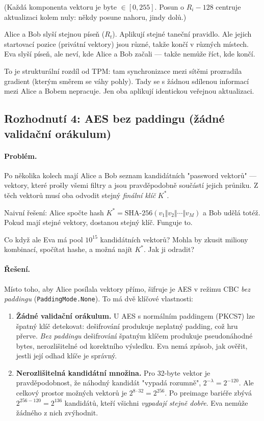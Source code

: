 \documentclass[11pt,a4paper]{article}
\begin{document}
(Každá komponenta vektoru je byte $\in [0, 255]$. Posun o $R_i - 128$ centruje aktualizaci kolem nuly: někdy posune nahoru, jindy dolů.)

\begin{aha}
Alice a Bob slyší stejnou píseň ($R_t$). Aplikují stejné taneční pravidlo. Ale jejich startovací pozice (privátní vektory) jsou různé, takže končí v různých místech. Eva slyší píseň, ale neví, kde Alice a Bob začali --- takže nemůže říct, kde končí.
\end{aha}

To je strukturální rozdíl od TPM: tam synchronizace mezi sítěmi prozradila gradient (kterým směrem se váhy pohly). Tady se s žádnou sdílenou informací mezi Alice a Bobem nepracuje. Jen oba aplikují identickou veřejnou aktualizaci.

\subsection{Rozhodnutí 4: AES bez paddingu (žádné validační orákulum)}\label{pop:design-aes}

\paragraph{Problém.} Po několika kolech mají Alice a Bob seznam kandidátních "password vektorů" --- vektory, které prošly všemi filtry a jsou pravděpodobně součástí jejich průniku. Z těch vektorů musí oba odvodit stejný \emph{finální klíč} $K^*$.

Naivní řešení: Alice spočte hash $K^* = \text{SHA-256}(v_1 \Vert v_2 \Vert \cdots \Vert v_M)$ a Bob udělá totéž. Pokud mají stejné vektory, dostanou stejný klíč. Funguje to.

Co když ale Eva má pool $10^{15}$ kandidátních vektorů? Mohla by zkusit miliony kombinací, spočítat hashe, a možná najít $K^*$. Jak ji odradit?

\paragraph{Řešení.} Místo toho, aby Alice posílala vektory přímo, šifruje je AES v režimu CBC \emph{bez paddingu} (\texttt{PaddingMode.None}). To má dvě klíčové vlastnosti:

\begin{enumerate}[leftmargin=*]
\item \textbf{Žádné validační orákulum.} U AES s normálním paddingem (PKCS7) lze špatný klíč detekovat: dešifrování produkuje neplatný padding, což hru přerve. \emph{Bez paddingu} dešifrování špatným klíčem produkuje pseudonáhodné bytes, nerozlišitelné od korektního výsledku. Eva nemá způsob, jak ověřit, jestli její odhad klíče je správný.
\item \textbf{Nerozlišitelná kandidátní množina.} Pro 32-byte vektor je pravděpodobnost, že náhodný kandidát "vypadá rozumně", $2^{-\lambda} = 2^{-120}$. Ale celkový prostor možných vektorů je $2^{8 \cdot 32} = 2^{256}$. Po preimage bariéře zbývá $2^{256-120} = 2^{136}$ kandidátů, kteří všichni \emph{vypadají stejně dobře}. Eva nemůže žádného z nich zvýhodnit.
\end{enumerate}
\end{document}
